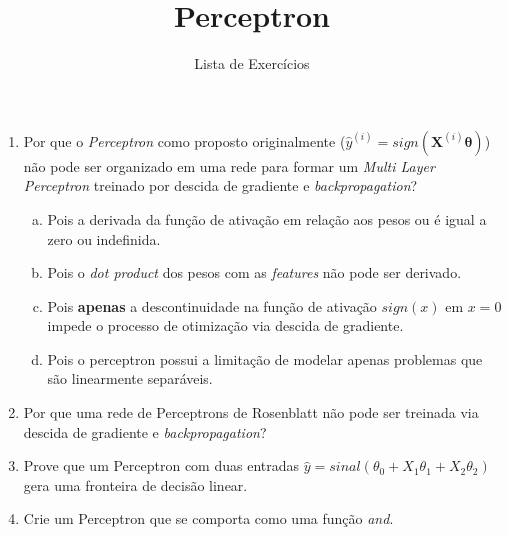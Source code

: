\documentclass{dlproblemset}
\title{Perceptron}
\subtitle{Lista de Exercícios}
\begin{document}
\begin{enumerate}[1)]

    \item Por que o \textit{Perceptron} como proposto originalmente ($\hat{y}^{(i)} = sign(\mathbf{X}^{(i)}\boldsymbol{\theta})$) não pode ser organizado em uma rede para formar um \textit{Multi Layer Perceptron} treinado por descida de gradiente e \textit{backpropagation}?
    \begin{enumerate}[(a)]
        \item Pois a derivada da função de ativação em relação aos pesos ou é igual a zero ou indefinida.
        \item Pois o \textit{dot product} dos pesos com as \textit{features} não pode ser derivado.
        \item Pois \textbf{apenas} a descontinuidade na função de ativação $sign(x)$ em $x = 0$ impede o processo de otimização via descida de gradiente.
        \item Pois o perceptron possui a limitação de modelar apenas problemas que são linearmente separáveis.
    \end{enumerate}

    \item Por que uma rede de Perceptrons de Rosenblatt não pode ser treinada via descida de gradiente e \textit{backpropagation}?

    \item Prove que um Perceptron com duas entradas $\hat{y}=sinal(\theta_0 + X_1\theta_1 + X_2\theta_2)$ gera uma fronteira de decisão linear.

    \item Crie um Perceptron que se comporta como uma função \textit{and}.


\end{enumerate}
\end{document}
